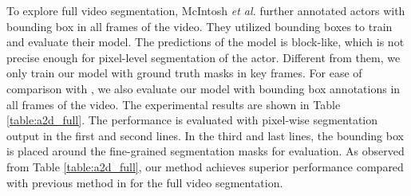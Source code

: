 \documentclass[journal]{IEEEtran}
\begin{document}
\begin{table}[!tb]
\begin{threeparttable}
\caption{Experimental results on A2D Sentences for full video segmentation}
\label{table:a2d_full}
\centering
{}
\end{threeparttable}
\vspace{-0.3cm}
\end{table}

To explore full video segmentation, McIntosh \emph{et al.} further annotated actors with bounding box in all frames of the video. They utilized bounding boxes to train and evaluate their model. The predictions of the model is block-like, which is not precise enough for pixel-level segmentation of the actor. Different from them, we only train our model with ground truth masks in key frames. For ease of comparison with \cite{mcintosh2018multi}, we also evaluate our model with bounding box annotations in all frames of the video. The experimental results are shown in Table \ref{table:a2d_full}. The performance is evaluated with pixel-wise segmentation output in the first and second lines. In the third and last lines, the bounding box is placed around the fine-grained segmentation masks for evaluation. As observed from Table \ref{table:a2d_full}, our method achieves superior performance compared with previous method in \cite{mcintosh2018multi} for the full video segmentation.
\end{document}
